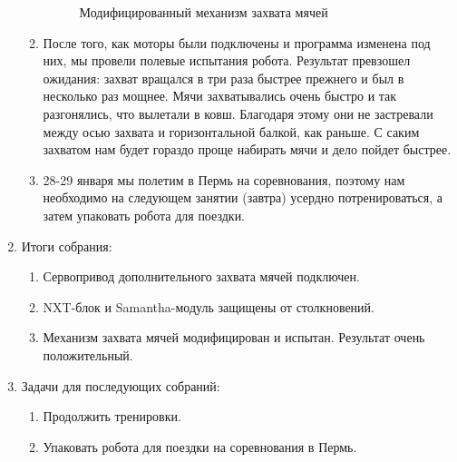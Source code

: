 \begin{enumerate}
\begin{enumerate}
\begin{figure}[H]
\begin{minipage}[h]{0.24\linewidth}
	  	  \end{minipage}
	  	  \caption{Модифицированный механизм захвата мячей}
	   \end{figure}
	   
	   \item После того, как моторы были подключены и программа изменена под них, мы провели полевые испытания робота. Результат превзошел ожидания: захват вращался в три раза быстрее прежнего и был в несколько раз мощнее. Мячи захватывались очень быстро и так разгонялись, что вылетали в ковш. Благодаря этому они не застревали между осью захвата и горизонтальной балкой, как раньше. С саким захватом нам будет гораздо проще набирать мячи и дело пойдет быстрее.
	   
	   \item 28-29 января мы полетим в Пермь на соревнования, поэтому нам необходимо на следующем занятии (завтра) усердно потренироваться, а затем упаковать робота для поездки.

	\end{enumerate}
	
	\item Итоги собрания:
	\begin{enumerate}
		
		\item Сервопривод дополнительного захвата мячей подключен.
		
		\item NXT-блок и Samantha-модуль защищены от столкновений.
		
        \item Механизм захвата мячей модифицирован и испытан. Результат очень положительный.
		
	\end{enumerate}
	
	\item Задачи для последующих собраний:
	\begin{enumerate}
		
		\item Продолжить тренировки.
		
		\item Упаковать робота для поездки на соревнования в Пермь.
			
	\end{enumerate}
\end{enumerate}
\fillpage
